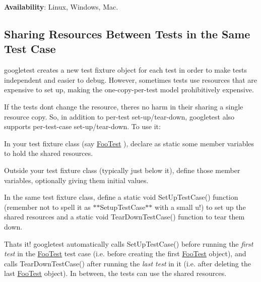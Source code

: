 {\bfseries{Availability}}\+: Linux, Windows, Mac.

\subsection*{Sharing Resources Between Tests in the Same Test Case}

googletest creates a new test fixture object for each test in order to make tests independent and easier to debug. However, sometimes tests use resources that are expensive to set up, making the one-\/copy-\/per-\/test model prohibitively expensive.

If the tests don\textquotesingle{}t change the resource, there\textquotesingle{}s no harm in their sharing a single resource copy. So, in addition to per-\/test set-\/up/tear-\/down, googletest also supports per-\/test-\/case set-\/up/tear-\/down. To use it\+:


\begin{DoxyEnumerate}
\item In your test fixture class (say {\ttfamily \mbox{\hyperlink{classFooTest}{Foo\+Test}}} ), declare as {\ttfamily static} some member variables to hold the shared resources.
\end{DoxyEnumerate}
\begin{DoxyEnumerate}
\item Outside your test fixture class (typically just below it), define those member variables, optionally giving them initial values.
\end{DoxyEnumerate}
\begin{DoxyEnumerate}
\item In the same test fixture class, define a {\ttfamily static void Set\+Up\+Test\+Case()} function (remember not to spell it as $\ast$$\ast${\ttfamily Setup\+Test\+Case}$\ast$$\ast$ with a small {\ttfamily u}!) to set up the shared resources and a {\ttfamily static void Tear\+Down\+Test\+Case()} function to tear them down.
\end{DoxyEnumerate}

That\textquotesingle{}s it! googletest automatically calls {\ttfamily Set\+Up\+Test\+Case()} before running the {\itshape first test} in the {\ttfamily \mbox{\hyperlink{classFooTest}{Foo\+Test}}} test case (i.\+e. before creating the first {\ttfamily \mbox{\hyperlink{classFooTest}{Foo\+Test}}} object), and calls {\ttfamily Tear\+Down\+Test\+Case()} after running the {\itshape last test} in it (i.\+e. after deleting the last {\ttfamily \mbox{\hyperlink{classFooTest}{Foo\+Test}}} object). In between, the tests can use the shared resources.

